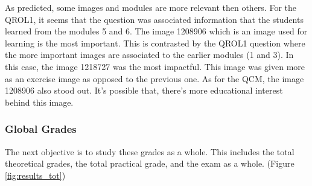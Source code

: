\documentclass[a4paper,11pt]{report}
\numberwithin{figure}{section} %
\begin{document}
    As predicted, some images and modules are more relevant then others.
    For the QROL1, it seems that the question was associated information that the students learned from the modules 5 and 6.
    The image 1208906 which is an image used for learning is the most important.
    This is contrasted by the QROL1 question where the more important images are associated to the earlier modules (1 and 3).
    In this case, the image 1218727 was the most impactful.
    This image was given more as an exercise image as opposed to the previous one.
    As for the QCM, the image 1208906 also stood out.
    It's possible that, there's more educational interest behind this image.

    \subsubsection{Global Grades}

    The next objective is to study these grades as a whole.
    This includes the total theoretical grades, the total practical grade, and the exam as a whole. (Figure \ref{fig:results_tot})
\end{document}
